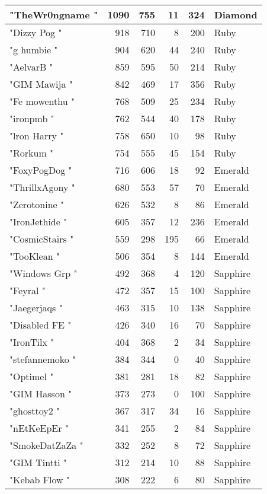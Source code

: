 \documentclass{article}
\begin{document}
\begin{table}[htbp]
\begin{tabular}{|l|r|r|r|r|l|}
"TheWr0ngname " & 1090 & 755 & 11 & 324 & Diamond \\ \hline
"Dizzy Pog " & 918 & 710 & 8 & 200 & Ruby \\ \hline
"g humbie " & 904 & 620 & 44 & 240 & Ruby \\ \hline
"AelvarB " & 859 & 595 & 50 & 214 & Ruby \\ \hline
"GIM Mawija " & 842 & 469 & 17 & 356 & Ruby \\ \hline
"Fe mowenthu " & 768 & 509 & 25 & 234 & Ruby \\ \hline
"ironpmb " & 762 & 544 & 40 & 178 & Ruby \\ \hline
"lron Harry " & 758 & 650 & 10 & 98 & Ruby \\ \hline
"Rorkum " & 754 & 555 & 45 & 154 & Ruby \\ \hline
"FoxyPogDog " & 716 & 606 & 18 & 92 & Emerald \\ \hline
"ThrillxAgony " & 680 & 553 & 57 & 70 & Emerald \\ \hline
"Zerotonine " & 626 & 532 & 8 & 86 & Emerald \\ \hline
"IronJethide " & 605 & 357 & 12 & 236 & Emerald \\ \hline
"CosmicStairs " & 559 & 298 & 195 & 66 & Emerald \\ \hline
"TooKlean " & 506 & 354 & 8 & 144 & Emerald \\ \hline
"Windows Grp " & 492 & 368 & 4 & 120 & Sapphire \\ \hline
"Feyral " & 472 & 357 & 15 & 100 & Sapphire \\ \hline
"Jaegerjaqs " & 463 & 315 & 10 & 138 & Sapphire \\ \hline
"Disabled FE " & 426 & 340 & 16 & 70 & Sapphire \\ \hline
"IronTilx " & 404 & 368 & 2 & 34 & Sapphire \\ \hline
"stefannemoko " & 384 & 344 & 0 & 40 & Sapphire \\ \hline
"Optimel " & 381 & 281 & 18 & 82 & Sapphire \\ \hline
"GIM Hasson " & 373 & 273 & 0 & 100 & Sapphire \\ \hline
"ghosttoy2 " & 367 & 317 & 34 & 16 & Sapphire \\ \hline
"nEtKeEpEr " & 341 & 255 & 2 & 84 & Sapphire \\ \hline
"SmokeDatZaZa " & 332 & 252 & 8 & 72 & Sapphire \\ \hline
"GIM Tintti " & 312 & 214 & 10 & 88 & Sapphire \\ \hline
"Kebab Flow " & 308 & 222 & 6 & 80 & Sapphire \\ \hline

\end{tabular}
\end{table}
\end{document}
